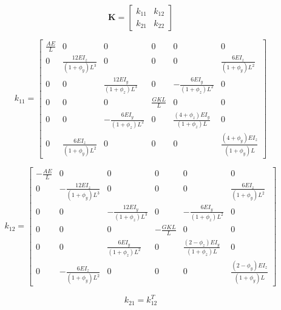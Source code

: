 \documentclass[doublespace,nopageskip]{VTthesis}
\begin{document}
			\begin{equation}
				\mathbf{K} =
				\begin{bmatrix}
					k_{11} & k_{12} \\
					k_{21} & k_{22}
				\end{bmatrix}
				\label{eq:K_timoshenko}
			\end{equation}
			
			\begin{equation}
				k_{11} =
				\begin{bmatrix}
					\frac{AE}{L} & 0 & 0 & 0 & 0 & 0 \\
					0 & \frac{12 E I_z}{(1+\phi_y)L^3} & 0 & 0 & 0 & \frac{6 E I_z}{(1+\phi_y)L^2} \\
					0 & 0 & \frac{12 E I_y}{(1+\phi_z)L^3} & 0 & -\frac{6 E I_y}{(1+\phi_z)L^2} & 0 \\
					0 & 0 & 0 & \frac{G K L}{L} & 0 & 0 \\
					0 & 0 & -\frac{6 E I_y}{(1+\phi_z)L^2} & 0 & \frac{(4+\phi_z) E I_y}{(1+\phi_z)L} & 0 \\
					0 & \frac{6 E I_z}{(1+\phi_y)L^2} & 0 & 0 & 0 & \frac{(4+\phi_y) E I_z}{(1+\phi_y)L}
				\end{bmatrix}
				\label{eq:k11}
			\end{equation}
			
			\begin{equation}
				k_{12} =
				\begin{bmatrix}
					-\frac{AE}{L} & 0 & 0 & 0 & 0 & 0 \\
					0 & -\frac{12 E I_z}{(1+\phi_y)L^3} & 0 & 0 & 0 & \frac{6 E I_z}{(1+\phi_y)L^2} \\
					0 & 0 & -\frac{12 E I_y}{(1+\phi_z)L^3} & 0 & -\frac{6 E I_y}{(1+\phi_z)L^2} & 0 \\
					0 & 0 & 0 & -\frac{G K L}{L} & 0 & 0 \\
					0 & 0 & \frac{6 E I_y}{(1+\phi_z)L^2} & 0 & \frac{(2-\phi_z) E I_y}{(1+\phi_z)L} & 0 \\
					0 & -\frac{6 E I_z}{(1+\phi_y)L^2} & 0 & 0 & 0 & \frac{(2-\phi_y) E I_z}{(1+\phi_y)L}
				\end{bmatrix}
				\label{eq:k12}
			\end{equation}
			
			\begin{equation}
				k_{21} = k_{12}^T
				\label{eq:k21}
			\end{equation}
			
\end{document}
